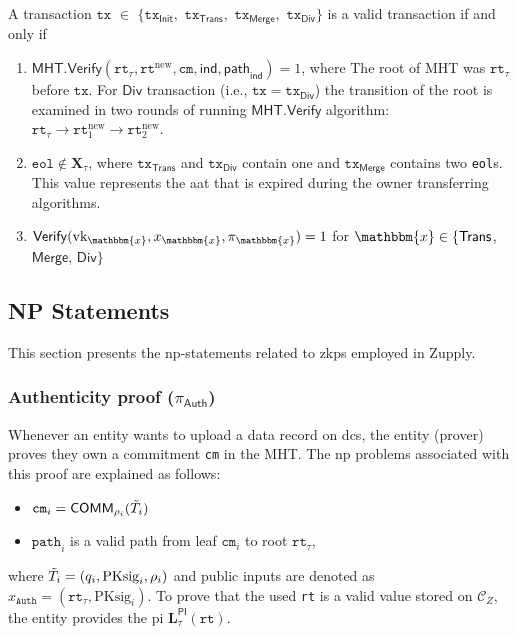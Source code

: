 \begin{definition}
	\label{def:Valid Transaction}
	A transaction $\texttt{tx} $ $ \in $ $ \{ \texttt{tx}_\textsf{Init}, $ $ \texttt{tx}_\textsf{Trans}, $ $ \texttt{tx}_\textsf{Merge}, $ $ \texttt{tx}_\textsf{Div} \}$ is a valid transaction if and only if
	\begin{enumerate}
		\item $\mathsf{MHT}.\mathsf{Verify}(\texttt{rt}_{\tau}, \texttt{rt}^\text{new}, \texttt{cm}, \mathsf{ind}, \mathsf{path}_\mathsf{ind}) = 1$, where The root of \textsf{MHT} was $\texttt{rt}_{\tau}$ before $\texttt{tx}$. For $\textsf{Div}$ transaction (i.e., $\texttt{tx}= \texttt{tx}_\textsf{Div}$) the transition of the root is examined in two rounds of running $\mathsf{MHT}.\mathsf{Verify}$ algorithm: $\texttt{rt}_\tau \rightarrow \texttt{rt}^\text{new}_1 \rightarrow \texttt{rt}^\text{new}_2$. 
		
		
		\item $\texttt{eol} \notin  \mathbf{X}_\tau$, where $\texttt{tx}_\mathsf{Trans}$ and $\texttt{tx}_\mathsf{Div}$ contain one and $\texttt{tx}_\mathsf{Merge}$ contains two \texttt{eol}s. This value represents the \gls{aat} that is expired during the owner transferring algorithms.
		
		\item $\mathsf{Verify}(\text{vk}_\mathbbm{x}, x_\mathbbm{x}, \pi_\mathbbm{x}) = 1$ for $\mathbbm{x} \in \{\mathsf{Trans}$, $\mathsf{Merge}$, $\mathsf{Div} \}$
		
	\end{enumerate}
\end{definition}




\subsection{NP Statements}
\label{sec:Zero-knowledge Proofs}
This section presents the \gls{np}-statements related to \gls{zkp}s employed in Zupply. 


\subsubsection{Authenticity proof ($\pi_\textsf{Auth}$)}
Whenever an entity wants to upload a data record on \gls{dcs}, the entity (prover) proves they own a commitment \texttt{cm} in the \textsf{MHT}. The \gls{np} problems associated with this proof are explained as follows:

    
\begin{itemize}

    \item $\texttt{cm}_i =\mathsf{COMM}_{\rho_i}(\Tilde{T}_i)$
	\item $\texttt{path}_i$ is a valid path from leaf  $\texttt{cm}_i$ to root $\texttt{rt}_\tau$,
\end{itemize}
where $\Tilde{T}_i = (q_i, \text{PKsig}_i, \rho_i)$ and public inputs are denoted as $x_\texttt{Auth} = (\texttt{rt}_\tau, \text{PKsig}_{i})$. To prove that the used \texttt{rt} is a valid value stored on $\mathcal{C}_Z$, the entity provides the \gls{pi} $\mathbf{L}_\tau^\mathsf{PI}(\texttt{rt})$.




